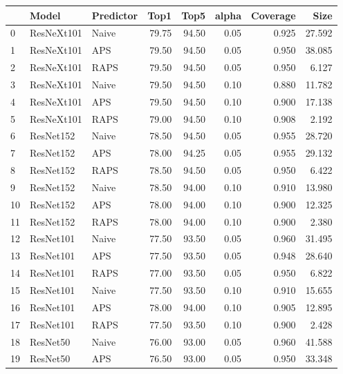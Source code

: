 \begin{tabular}{lllrrrrr}
\toprule
{} &        Model & Predictor &   Top1 &   Top5 &  alpha &  Coverage &     Size \\
\midrule
0  &   ResNeXt101 &     Naive &  79.75 &  94.50 &   0.05 &     0.925 &   27.592 \\
1  &   ResNeXt101 &       APS &  79.50 &  94.50 &   0.05 &     0.950 &   38.085 \\
2  &   ResNeXt101 &      RAPS &  79.50 &  94.50 &   0.05 &     0.950 &    6.127 \\
3  &   ResNeXt101 &     Naive &  79.50 &  94.50 &   0.10 &     0.880 &   11.782 \\
4  &   ResNeXt101 &       APS &  79.50 &  94.50 &   0.10 &     0.900 &   17.138 \\
5  &   ResNeXt101 &      RAPS &  79.00 &  94.50 &   0.10 &     0.908 &    2.192 \\
6  &    ResNet152 &     Naive &  78.50 &  94.50 &   0.05 &     0.955 &   28.720 \\
7  &    ResNet152 &       APS &  78.00 &  94.25 &   0.05 &     0.955 &   29.132 \\
8  &    ResNet152 &      RAPS &  78.50 &  94.50 &   0.05 &     0.950 &    6.422 \\
9  &    ResNet152 &     Naive &  78.50 &  94.00 &   0.10 &     0.910 &   13.980 \\
10 &    ResNet152 &       APS &  78.00 &  94.00 &   0.10 &     0.900 &   12.325 \\
11 &    ResNet152 &      RAPS &  78.00 &  94.00 &   0.10 &     0.900 &    2.380 \\
12 &    ResNet101 &     Naive &  77.50 &  93.50 &   0.05 &     0.960 &   31.495 \\
13 &    ResNet101 &       APS &  77.50 &  93.50 &   0.05 &     0.948 &   28.640 \\
14 &    ResNet101 &      RAPS &  77.00 &  93.50 &   0.05 &     0.950 &    6.822 \\
15 &    ResNet101 &     Naive &  77.50 &  93.50 &   0.10 &     0.910 &   15.655 \\
16 &    ResNet101 &       APS &  78.00 &  94.00 &   0.10 &     0.905 &   12.895 \\
17 &    ResNet101 &      RAPS &  77.50 &  93.50 &   0.10 &     0.900 &    2.428 \\
18 &     ResNet50 &     Naive &  76.00 &  93.00 &   0.05 &     0.960 &   41.588 \\
19 &     ResNet50 &       APS &  76.50 &  93.00 &   0.05 &     0.950 &   33.348 \\

\end{tabular}

